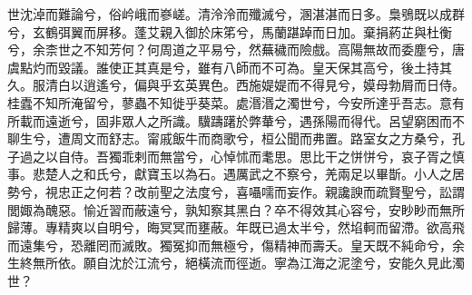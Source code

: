 
\begin{pinyinscope}
世沈淖而難論兮，俗岒峨而嵾嵯。清泠泠而殲滅兮，溷湛湛而日多。梟鴞既以成群兮，玄鶴弭翼而屏移。蓬艾親入御於床笫兮，馬蘭踸踔而日加。棄捐葯芷與杜衡兮，余柰世之不知芳何？何周道之平易兮，然蕪穢而險戲。高陽無故而委塵兮，唐虞點灼而毀議。誰使正其真是兮，雖有八師而不可為。皇天保其高兮，後土持其久。服清白以逍遙兮，偏與乎玄英異色。西施媞媞而不得見兮，嫫母勃屑而日侍。桂蠹不知所淹留兮，蓼蟲不知徙乎葵菜。處湣湣之濁世兮，今安所達乎吾志。意有所載而遠逝兮，固非眾人之所識。驥躊躇於弊輂兮，遇孫陽而得代。呂望窮困而不聊生兮，遭周文而舒志。甯戚飯牛而商歌兮，桓公聞而弗置。路室女之方桑兮，孔子過之以自侍。吾獨乖剌而無當兮，心悼怵而耄思。思比干之恲恲兮，哀子胥之慎事。悲楚人之和氏兮，獻寶玉以為石。遇厲武之不察兮，羌兩足以畢斮。小人之居勢兮，視忠正之何若？改前聖之法度兮，喜囁嚅而妄作。親讒諛而疏賢聖兮，訟謂閭娵為醜惡。愉近習而蔽遠兮，孰知察其黑白？卒不得效其心容兮，安眇眇而無所歸薄。專精爽以自明兮，晦冥冥而壅蔽。年既已過太半兮，然埳軻而留滯。欲高飛而遠集兮，恐離罔而滅敗。獨冤抑而無極兮，傷精神而壽夭。皇天既不純命兮，余生終無所依。願自沈於江流兮，絕橫流而徑逝。寧為江海之泥塗兮，安能久見此濁世？


\end{pinyinscope}